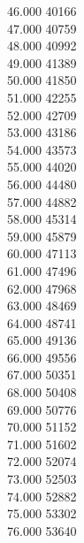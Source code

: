{ 46.000	40166 \\
 47.000	40759 \\
 48.000	40992 \\
 49.000	41389 \\
 50.000	41850 \\
 51.000	42255 \\
 52.000	42709 \\
 53.000	43186 \\
 54.000	43573 \\
 55.000	44020 \\
 56.000	44480 \\
 57.000	44882 \\
 58.000	45314 \\
 59.000	45879 \\
 60.000	47113 \\
 61.000	47496 \\
 62.000	47968 \\
 63.000	48469 \\
 64.000	48741 \\
 65.000	49136 \\
 66.000	49556 \\
 67.000	50351 \\
 68.000	50408 \\
 69.000	50776 \\
 70.000	51152 \\
 71.000	51602 \\
 72.000	52074 \\
 73.000	52503 \\
 74.000	52882 \\
 75.000	53302 \\
 76.000	53640 \\
}
